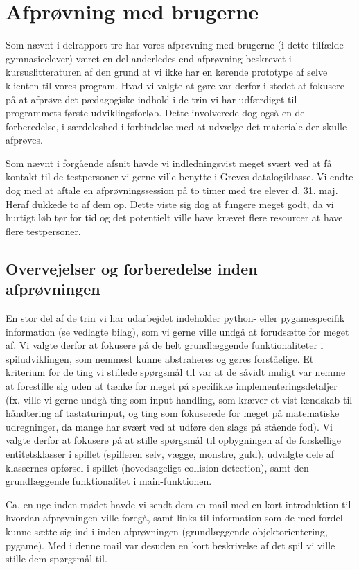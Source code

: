 \documentclass[10pt,a4paper,danish]{article}
\begin{document}
\section{Afprøvning med brugerne}
Som nævnt i delrapport tre har vores afprøvning med brugerne (i dette tilfælde gymnasieelever)
været en del anderledes end afprøvning beskrevet i kursuslitteraturen af den grund at vi ikke 
har en kørende prototype af selve klienten til vores program. Hvad vi valgte at gøre var 
derfor i stedet at fokusere på at afprøve det pædagogiske indhold i de trin vi har udfærdiget
til programmets første udviklingsforløb. Dette involverede dog også en del forberedelse, i 
særdeleshed i forbindelse med at udvælge det materiale der skulle afprøves. 

Som nævnt i forgående afsnit havde vi indledningsvist meget svært ved at få kontakt til de 
testpersoner vi gerne ville benytte i Greves datalogiklasse. Vi endte dog med at aftale en 
afprøvningssession på to timer med tre elever d. 31. maj. Heraf dukkede to af dem op. Dette viste sig dog
at fungere meget godt, da vi hurtigt løb tør for tid og det potentielt ville have krævet flere resourcer
at have flere testpersoner.

\subsection{Overvejelser og forberedelse inden afprøvningen}
En stor del af de trin vi har udarbejdet indeholder python- eller pygamespecifik information (se vedlagte bilag), som 
vi gerne ville undgå at forudsætte for meget af. Vi valgte derfor at fokusere på de helt 
grundlæggende funktionaliteter i spiludviklingen, som nemmest kunne abstraheres og gøres forståelige.
Et kriterium for de ting vi stillede spørgsmål til var at de såvidt muligt var nemme at
forestille sig uden at tænke for meget på specifikke implementeringsdetaljer (fx. ville vi gerne undgå
ting som input handling, som kræver et vist kendskab til håndtering af tastaturinput, og ting som 
fokuserede for meget på matematiske udregninger, da mange har svært ved at udføre den slags på stående fod). 
Vi valgte derfor at fokusere på at stille spørgsmål til opbygningen af de forskellige entitetsklasser i spillet
(spilleren selv, vægge, monstre, guld), udvalgte dele af klassernes opførsel i spillet (hovedsageligt collision
detection), samt den grundlæggende funktionalitet i main-funktionen. 

Ca. en uge inden mødet havde vi sendt dem en mail med en kort introduktion til hvordan afprøvningen 
ville foregå, samt links til information som de med fordel kunne sætte sig ind i inden afprøvningen 
(grundlæggende objektorientering, pygame). Med i denne mail var desuden en kort beskrivelse af det spil
vi ville stille dem spørgsmål til. 
\end{document}
